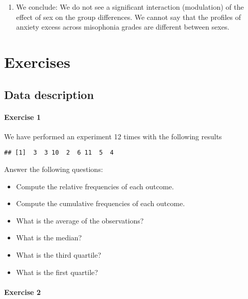 \documentclass[
]{book}
\providecommand{\tightlist}{%
  \setlength{\itemsep}{0pt}\setlength{\parskip}{0pt}}
\begin{document}
\begin{enumerate}
\def\labelenumi{\alph{enumi}.}
\setcounter{enumi}{2}
\tightlist
\item
  We conclude: We do not see a significant interaction (modulation) of the effect of sex on the group differences. We cannot say that the profiles of anxiety excess across misophonia grades are different between sexes.
\end{enumerate}

\hypertarget{exercises}{%
\chapter{Exercises}\label{exercises}}

\hypertarget{data-description-1}{%
\section{Data description}\label{data-description-1}}

\hypertarget{exercise-1}{%
\subsubsection{Exercise 1}\label{exercise-1}}

We have performed an experiment 12 times with the following results

\begin{verbatim}
## [1]  3  3 10  2  6 11  5  4
\end{verbatim}

Answer the following questions:

\begin{itemize}
\tightlist
\item
  Compute the relative frequencies of each outcome.
\item
  Compute the cumulative frequencies of each outcome.
\item
  What is the average of the observations?
\item
  What is the median?
\item
  What is the third quartile?
\item
  What is the first quartile?
\end{itemize}

\hypertarget{exercise-2}{%
\subsubsection{Exercise 2}\label{exercise-2}}
\end{document}
